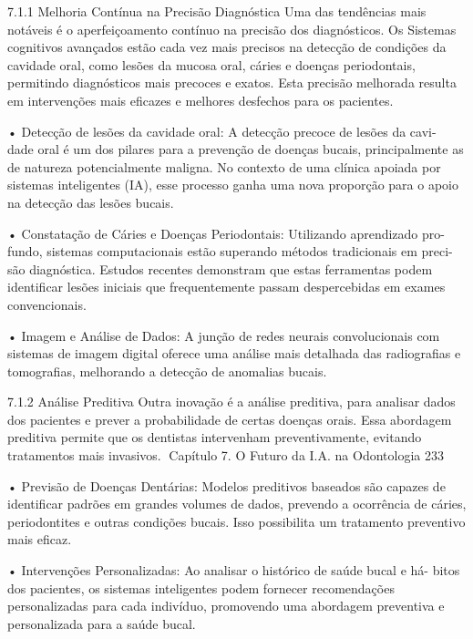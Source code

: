 7.1.1    Melhoria Contínua na Precisão Diagnóstica
Uma das tendências mais notáveis é o aperfeiçoamento contínuo na precisão dos
diagnósticos. Os Sistemas cognitivos avançados estão cada vez mais precisos na
detecção de condições da cavidade oral, como lesões da mucosa oral, cáries e doenças
periodontais, permitindo diagnósticos mais precoces e exatos. Esta precisão melhorada
resulta em intervenções mais eficazes e melhores desfechos para os pacientes.

    • Detecção de lesões da cavidade oral: A detecção precoce de lesões da cavi-
      dade oral é um dos pilares para a prevenção de doenças bucais, principalmente
      as de natureza potencialmente maligna. No contexto de uma clínica apoiada por
      sistemas inteligentes (IA), esse processo ganha uma nova proporção para o apoio
      na detecção das lesões bucais.

    • Constatação de Cáries e Doenças Periodontais: Utilizando aprendizado pro-
      fundo, sistemas computacionais estão superando métodos tradicionais em preci-
      são diagnóstica. Estudos recentes demonstram que estas ferramentas podem
      identificar lesões iniciais que frequentemente passam despercebidas em exames
      convencionais.

    • Imagem e Análise de Dados: A junção de redes neurais convolucionais com
      sistemas de imagem digital oferece uma análise mais detalhada das radiografias
      e tomografias, melhorando a detecção de anomalias bucais.

7.1.2    Análise Preditiva
Outra inovação é a análise preditiva, para analisar dados dos pacientes e prever a
probabilidade de certas doenças orais. Essa abordagem preditiva permite que os
dentistas intervenham preventivamente, evitando tratamentos mais invasivos.
Capítulo 7. O Futuro da I.A. na Odontologia                                             233


    • Previsão de Doenças Dentárias: Modelos preditivos baseados são capazes
      de identificar padrões em grandes volumes de dados, prevendo a ocorrência de
      cáries, periodontites e outras condições bucais. Isso possibilita um tratamento
      preventivo mais eficaz.

    • Intervenções Personalizadas: Ao analisar o histórico de saúde bucal e há-
      bitos dos pacientes, os sistemas inteligentes podem fornecer recomendações
      personalizadas para cada indivíduo, promovendo uma abordagem preventiva e
      personalizada para a saúde bucal.


